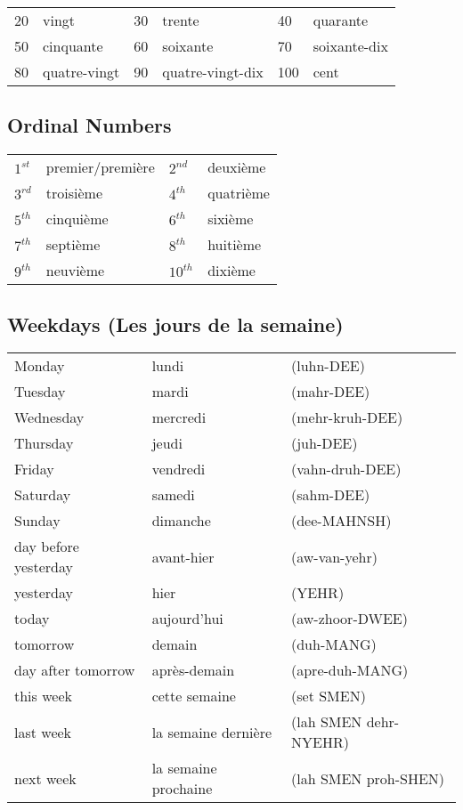 \begin{tabular}{| l | l | l | l | l | l |}
\hline
20  & vingt         & 30  & trente          & 40  & quarante\\
50  & cinquante     & 60  & soixante        & 70  & soixante-dix\\
80  & quatre-vingt  & 90  & quatre-vingt-dix& 100 & cent\\
\hline
\end{tabular}

\subsection{Ordinal Numbers}
\begin{tabular}{| l | l | l | l |}
\hline
$1^{st}$  & premier/premi\`ere  & $2^{nd}$   & deuxi\`eme   \\
$3^{rd}$  & troisi\`eme         & $4^{th}$   & quatri\`eme  \\
$5^{th}$  & cinqui\`eme         & $6^{th}$   & sixi\`eme    \\
$7^{th}$  & septi\`eme          & $8^{th}$   & huiti\`eme   \\
$9^{th}$  & neuvi\`eme          & $10^{th}$  & dixi\`eme    \\
\hline
\end{tabular}

\subsection{Weekdays (Les jours de la semaine)}

\begin{tabular}{| l | l | l |}
\hline
Monday    & lundi     & (luhn-DEE)      \\
Tuesday   & mardi     & (mahr-DEE)      \\
Wednesday & mercredi  & (mehr-kruh-DEE) \\
Thursday  & jeudi     & (juh-DEE)       \\
Friday    & vendredi  & (vahn-druh-DEE) \\
Saturday  & samedi    & (sahm-DEE)      \\
Sunday    & dimanche  & (dee-MAHNSH)    \\
\hline
\hline
day before yesterday & avant-hier & (aw-van-yehr) \\
yesterday & hier        & (YEHR)          \\
today     & aujourd'hui & (aw-zhoor-DWEE) \\
tomorrow  & demain      & (duh-MANG)    \\
day after tomorrow & apr\`{e}s-demain & (apre-duh-MANG) \\
this week & cette semaine & (set SMEN)  \\
last week & la semaine dernière   & (lah SMEN dehr-NYEHR)\\
next week & la semaine prochaine  & (lah SMEN proh-SHEN)  \\
\hline
\end{tabular}


